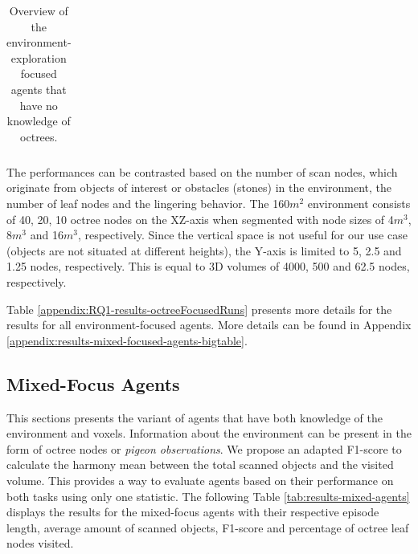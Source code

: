 \begin{longtable}{|l|c|c|c|c|}
    \caption{Overview of the environment-exploration focused agents that have no knowledge of octrees. 
    }
    \label{tab:RQ2-results-noknowledgeofOctrees}
\end{longtable}


 The performances can be contrasted based on the number of scan nodes, which originate from objects of interest or obstacles (stones) in the environment, the number of leaf nodes and the lingering behavior. 
The 160$m^2$ environment consists of 40, 20, 10 octree nodes on the XZ-axis when segmented with node sizes of 4$m^3$, 8$m^3$ and 16$m^3$, respectively. Since the vertical space is not useful for our use case (objects are not situated at different heights), the Y-axis is limited to 5, 2.5 and 1.25 nodes, respectively. This is equal to 3D volumes of 4000, 500 and 62.5 nodes, respectively.

Table \ref{appendix:RQ1-results-octreeFocusedRuns} presents more details for the results for all environment-focused agents. More details can be found in Appendix \ref{appendix:results-mixed-focused-agents-bigtable}.

\newpage



\subsection{Mixed-Focus Agents}
This sections presents the variant of agents that have both knowledge of the environment and voxels. Information about the environment can be present in the form of octree nodes or \textit{pigeon observations}. 
We propose an adapted F1-score \cite{f1score2022} to calculate the harmony mean between the total scanned objects and the visited volume. This provides a way to evaluate agents based on their performance on both tasks using only one statistic. 
The following Table \ref{tab:results-mixed-agents} displays the results for the mixed-focus agents with their respective episode length, average amount of scanned objects, F1-score and percentage of octree leaf nodes visited.


